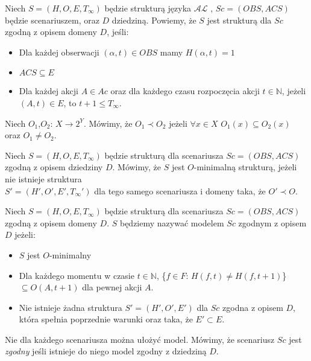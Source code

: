    \begin{definition}
   Niech $S = (H,O,E,T_{\infty})$ będzie strukturą języka $\mathcal{AL}$ , $ Sc=(OBS,ACS) $ będzie scenariuszem, oraz $ D $ dziedziną. Powiemy, że $ S $ jest strukturą dla $Sc$ zgodną z opisem domeny $D$, jeśli:
   		\begin{itemize} 
     		\item Dla każdej obserwacji $(\alpha,t )\in OBS$ mamy $H(\alpha,t )=1$
     		\item $ACS \subseteq E$ 
     		\item Dla każdej akcji $ {A \in Ac}$ oraz dla każdego czasu rozpoczęcia akcji $t \in \mathbb{N}$, jeżeli $(A,t) \in E $, to $t+1 \leq T_{\infty}$. 
    		\end{itemize} 
   \end{definition}
   \begin{definition}
	   Niech $O_{1}$,$O_{2}$: $X \longrightarrow 2^{Y}$. Mówimy, że $O_{1} \prec O_{2}$ jeżeli $\forall x\in X$ $O_{1}(x)\subseteq O_{2}(x)$ oraz $O_{1}\neq O_{2}$.
   \end{definition}
   
   \begin{definition}
   Niech $S=(H,O,E,T_{\infty})$ będzie strukturą dla scenariusza $Sc=(OBS,ACS)$ zgodną z opisem dziedziny $D$. Mówimy, że $S$ jest $O$-minimalną strukturą, jeżeli nie istnieje struktura \\$S'=(H',O',E',T_{\infty}')$ dla tego samego scenariusza i domeny taka, że $O'\prec O$.  
   \end{definition}
   \begin{definition}
   Niech $S=(H,O,E,T_{\infty})$ będzie strukturą dla scenariusza $Sc=(OBS,ACS)$ zgodną z opisem domeny $D$. $S$ będziemy nazywać modelem $Sc$ zgodnym z opisem $D$ jeżeli:
   \begin{itemize}
		\item $S$ jest $O$-minimalny
		\item Dla każdego momentu w czasie $t \in \mathbb{N}$,  \{$f\in F$: $H(f,t)\neq H(f,t+1) $\} $\subseteq O(A,t+1)$ dla pewnej akcji $A$.
		\item Nie istnieje żadna struktura $S'=(H',O',E')$ dla $Sc$ zgodna z opisem $D$, która spełnia poprzednie warunki oraz taka, że $E'\subset E$. 
   \end{itemize}
\end{definition}

\begin{remark}
Nie dla każdego scenariusza można ułożyć model. Mówimy, że scenariusz $Sc$ jest \textit{zgodny} jeśli istnieje do niego model zgodny z dziedziną $D$.
\end{remark}

